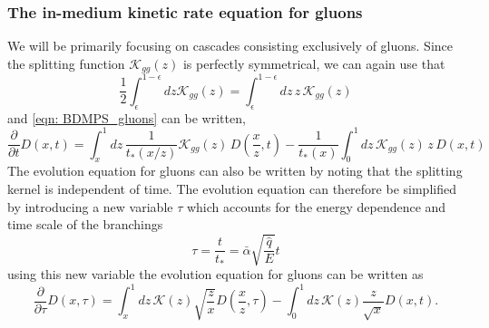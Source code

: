 \documentclass[main.tex]{subfiles}
\begin{document}
\subsubsection*{The in-medium kinetic rate equation for gluons}
We will be primarily focusing on cascades consisting exclusively of gluons. Since the splitting function \(\mathcal{K}_{gg}(z)\) is perfectly symmetrical, we can again use that
\begin{equation}
    \frac{1}{2} \int_\epsilon^{1-\epsilon} dz \mathcal{K}_{gg}(z) = \int_\epsilon^{1-\epsilon} dz\, z\, \mathcal{K}_{gg}(z)
\end{equation}
and \autoref{eqn: BDMPS_gluons} can be written, 
\begin{equation}\label{eqn: BDMPS_2.8_Blaizot}
    \frac{\partial}{\partial t} D(x,t) = \int_x^1 dz\,\frac{1}{t_*(x/z)} \mathcal{K}_{gg}(z)\, D\left(\frac{x}{z},t\right) - \frac{1}{t_*(x)} \int_0^1 dz\,\mathcal{K}_{gg}(z) \,z\, D(x,t)
\end{equation}
The evolution equation for gluons can also be written by noting that the splitting kernel is independent of time. The evolution equation can therefore be simplified by introducing a new variable \(\tau\) which accounts for the energy dependence and time scale of the branchings
\begin{equation}\label{eqn: medium_tau_definiton}
    \tau = \frac{t}{t_*}= \bar \alpha \sqrt{\frac{\hat{q}}{E}} t
\end{equation}
using this new variable the evolution equation for gluons can be written as
\begin{equation}\label{eqn: BDMPS_solution_startingpoint}
    \frac{\partial}{\partial \tau} D(x, \tau) = \int_x^1 dz \,\mathcal{K}(z) \sqrt{\frac{z}{x}} D\left(\frac{x}{z}, \tau\right) - \int_0^1 dz \,\mathcal{K}(z) \frac{z}{\sqrt{x}} D(x,t).
\end{equation}
\end{document}
